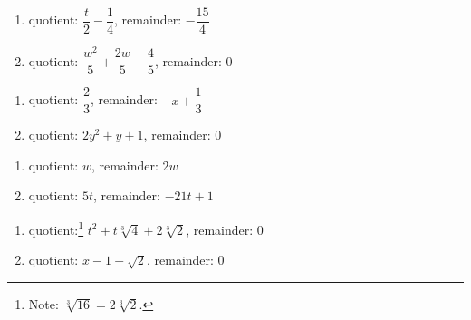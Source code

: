 \begin{multicols}{2}
\begin{enumerate}
\setcounter{enumi}{\value{HW}}

\item quotient: $\dfrac{t}{2} - \dfrac{1}{4}$, remainder: $-\dfrac{15}{4}$ 

\item quotient: $\dfrac{w^2}{5} + \dfrac{2w}{5} + \dfrac{4}{5}$, remainder: $0$

\setcounter{HW}{\value{enumi}}
\end{enumerate}
\end{multicols}

\begin{multicols}{2}
\begin{enumerate}
\setcounter{enumi}{\value{HW}}

\item quotient: $\dfrac{2}{3}$, remainder: $-x + \dfrac{1}{3}$

\item quotient:  $2y^2+y+1$, remainder: $0$ 

\setcounter{HW}{\value{enumi}}
\end{enumerate}
\end{multicols}

\begin{multicols}{2}
\begin{enumerate}
\setcounter{enumi}{\value{HW}}

\item quotient: $w$, remainder: $2w$
\item quotient: $5t$, remainder: $-21t + 1$


\setcounter{HW}{\value{enumi}}
\end{enumerate}
\end{multicols}

\begin{multicols}{2}
\begin{enumerate}
\setcounter{enumi}{\value{HW}}
\item quotient:\footnote{Note: $\sqrt[3]{16} = 2\sqrt[3]{2}$.} $t^2 + t \sqrt[3]{4} + 2\sqrt[3]{2}$, remainder: $0$

\item quotient: $x -1 - \sqrt{2}$, remainder: 0  
\setcounter{HW}{\value{enumi}}
\end{enumerate}
\end{multicols}
